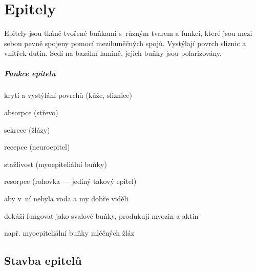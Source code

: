 \documentclass[DIV=8]{scrreprt}
\begin{document}
\chapter{Epitely} \label{Epitely}


Epitely jsou tkáně tvořené buňkami s různým tvarem a funkcí, které jsou mezi sebou pevně spojeny pomocí mezibuněčných spojů. Vystýlají povrch sliznic a vnitřek dutin. Sedí na bazální lamině, jejich buňky jsou polarizovány.

\paragraph{Funkce epitelu}
\begin{myItemize}[nosep]
    \item krytí a vystýlání povrchů (kůže, sliznice)
    \item absorpce (střevo)
    \item sekrece (žlázy)
    \item recepce (neuroepitel)
    \item stažlivost (myoepiteliální buňky)
    \item resorpce (rohovka --- jediný takový epitel)
\begin{myItemize}[nosep]
    \item aby v ní nebyla voda a my dobře viděli
\end{myItemize}

    \item dokáží fungovat jako svalové buňky, produkují myozin a aktin
\begin{myItemize}[nosep]
    \item např. myoepiteliální buňky mléčných žláz
\end{myItemize}

\end{myItemize}



\section{Stavba epitelů} \label{Stavba epitelů} \FloatBarrier
\end{document}
